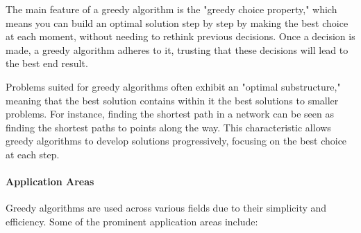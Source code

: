\documentclass[
]{article}
\begin{document}
The main feature of a greedy algorithm is the "greedy choice property," which means you can build an optimal solution step by step by making the best choice at each moment, without needing to rethink previous decisions. Once a decision is made, a greedy algorithm adheres to it, trusting that these decisions will lead to the best end result.

Problems suited for greedy algorithms often exhibit an "optimal substructure," meaning that the best solution contains within it the best solutions to smaller problems. For instance, finding the shortest path in a network can be seen as finding the shortest paths to points along the way. This characteristic allows greedy algorithms to develop solutions progressively, focusing on the best choice at each step.

\paragraph{Application Areas}

Greedy algorithms are used across various fields due to their simplicity and efficiency. Some of the prominent application areas include:
\end{document}
